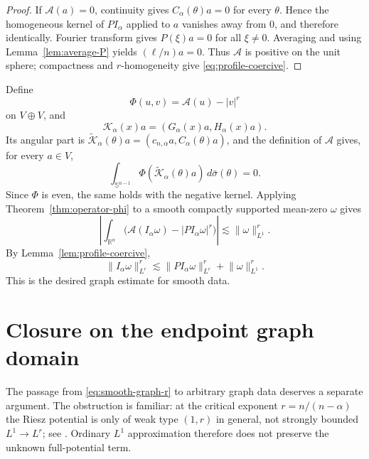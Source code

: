 \documentclass[10pt,a4paper]{amsart}
\numberwithin{equation}{section}
\newcommand{\R}{\mathbb R}
\newcommand{\Sph}{\mathbb S}
\newcommand{\norm}[1]{\lVert #1\rVert}
\begin{document}
\begin{proof}
If $\mathcal A(a)=0$, continuity gives $C_\alpha(\theta)a=0$ for every
$\theta$.  Hence the homogeneous kernel of $P I_\alpha$ applied to $a$
vanishes away from $0$, and therefore identically.  Fourier transform gives
$P(\xi)a=0$ for all $\xi\ne0$.  Averaging and using
Lemma~\ref{lem:average-P} yields $(\ell/n)a=0$.  Thus $\mathcal A$ is positive
on the unit sphere; compactness and $r$-homogeneity give
\eqref{eq:profile-coercive}.
\end{proof}

Define
\begin{equation}\label{eq:Phi-profile}
 \Phi(u,v)=\mathcal A(u)-|v|^r
\end{equation}
on $V\oplus V$, and
\begin{equation}\label{eq:paired-kernel}
 \mathcal K_\alpha(x)a=(G_\alpha(x)a,H_\alpha(x)a).
\end{equation}
Its angular part is
$\widetilde{\mathcal K}_\alpha(\theta)a
=(c_{n,\alpha}a,C_\alpha(\theta)a)$, and the definition of
$\mathcal A$ gives, for every $a\in V$,
\[
 \int_{\Sph^{n-1}}
 \Phi(\widetilde{\mathcal K}_\alpha(\theta)a)\,d\bar\sigma(\theta)=0.
\]
Since $\Phi$ is even, the same holds with the negative kernel.  Applying
Theorem~\ref{thm:operator-phi} to a smooth compactly supported
mean-zero $\omega$ gives
\begin{equation}\label{eq:profile-integral}
 \left|\int_{\R^n}
 \bigl(\mathcal A(I_\alpha\omega)-|P I_\alpha\omega|^r\bigr)\right|
 \lesssim \norm\omega_{L^1}^r.
\end{equation}
By Lemma~\ref{lem:profile-coercive},
\begin{equation}\label{eq:smooth-graph-r}
 \norm{I_\alpha\omega}_{L^r}^r
 \lesssim
 \norm{P I_\alpha\omega}_{L^r}^r+\norm\omega_{L^1}^r.
\end{equation}
This is the desired graph estimate for smooth data.

\section{Closure on the endpoint graph domain}\label{sec:closure}

The passage from \eqref{eq:smooth-graph-r} to arbitrary graph data deserves a
separate argument.  The obstruction is familiar: at the critical exponent
$r=n/(n-\alpha)$ the Riesz potential is only of weak type $(1,r)$ in general,
not strongly bounded $L^1\to L^r$; see \cite[Chapter~V]{Stein70}.  Ordinary
$L^1$ approximation therefore does not preserve the unknown full-potential
term.
\end{document}
